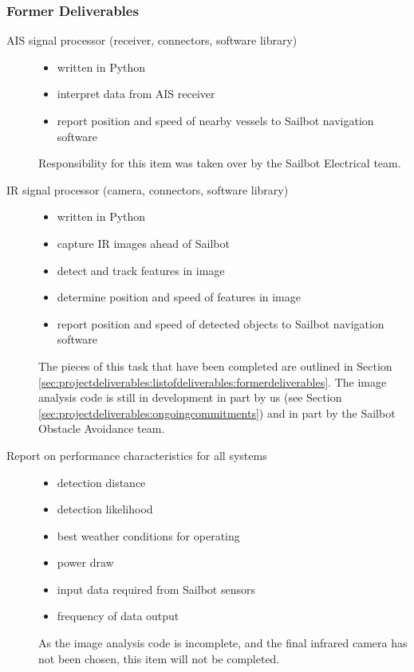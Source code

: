 \subsubsection{\label{sec:projectdeliverables:listofdeliverables:formerdeliverables}Former Deliverables}

\begin{description}
\item[AIS signal processor (receiver, connectors, software library)] \hfill
\begin{itemize}
\item written in Python
\item interpret data from AIS receiver
\item report position and speed of nearby vessels to Sailbot navigation software
\end{itemize}
Responsibility for this item was taken over by the Sailbot Electrical team.

\item[IR signal processor (camera, connectors, software library)] \hfill
\begin{itemize}
\item written in Python
\item capture IR images ahead of Sailbot
\item detect and track features in image
\item determine position and speed of features in image
\item report position and speed of detected objects to Sailbot navigation software
\end{itemize}
The pieces of this task that have been completed are outlined in Section \ref{sec:projectdeliverables:listofdeliverables:formerdeliverables}. The image analysis code is still in development in part by us (see Section \ref{sec:projectdeliverables:ongoingcommitments}) and in part by the Sailbot Obstacle Avoidance team.

\item[Report on performance characteristics for all systems] \hfill
\begin{itemize}
\item detection distance
\item detection likelihood
\item best weather conditions for operating
\item power draw
\item input data required from Sailbot sensors
\item frequency of data output
\end{itemize}
As the image analysis code is incomplete, and the final infrared camera has not been chosen, this item will not be completed.
\end{description}
